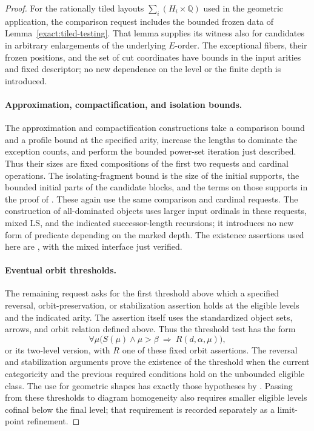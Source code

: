 \begin{proof}
For the rationally tiled layouts $\sum_i(H_i\times\mathbb Q)$ used
in the geometric application, the comparison request includes the
bounded frozen data of Lemma~\ref{exact:tiled-testing}.
That lemma supplies its witness also for candidates in arbitrary
enlargements of the underlying $E$-order.  The exceptional fibers,
their frozen positions, and the set of cut coordinates have bounds
in the input arities and fixed descriptor; no new dependence on the
level or the finite depth is introduced.

\paragraph{Approximation, compactification, and isolation bounds.}
The approximation and compactification constructions take a comparison
bound and a profile bound at the specified arity, increase the lengths
to dominate the exception counts, and perform the bounded power-set
iteration just described.  Thus their sizes are fixed compositions of
the first two requests and cardinal operations.  The isolating-fragment
bound is the size of the initial supports, the bounded initial parts of
the candidate blocks, and the terms on those supports in the proof of
.  These again use the same comparison and
cardinal requests.  The construction of all-dominated objects uses
larger input ordinals in these requests, mixed LS, and the indicated
successor-length recursions; it introduces no new form of predicate
depending on the marked depth.  The existence assertions used here are
, with the mixed interface just verified.

\paragraph{Eventual orbit thresholds.}
The remaining request asks for the first threshold above which a
specified reversal, orbit-preservation, or stabilization assertion holds
at the eligible levels and the indicated arity.  The assertion itself
uses the standardized object sets, arrows, and orbit relation defined
above.  Thus the threshold test has the form
\[
 \forall\mu\bigl(S(\mu)\land\mu>\beta
           \ \Longrightarrow\ R(d,\alpha,\mu)\bigr),
\]
or its two-level version, with $R$ one of these fixed orbit assertions.
The reversal and stabilization arguments prove the existence of the
threshold when the current categoricity and the previous required
conditions hold on the unbounded eligible class.  The use for geometric
shapes has exactly those hypotheses by
.  Passing from these thresholds to
diagram homogeneity also requires smaller eligible levels cofinal
below the final level; that requirement is recorded separately as a
limit-point refinement.


\end{proof}
